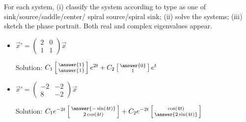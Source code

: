 \documentclass{ximera}
\begin{document}
\begin{exercise}%
    For each system, (i) classify the system according to type as one of sink/source/saddle/center/ spiral source/spiral sink; (ii) solve the systems; (iii) sketch the phase portrait. Both real and complex eigenvalues appear. %
    \begin{itemize}
        \item $\vec{x}'=\begin{pmatrix} 2&0 \\ 1&1 \end{pmatrix}\vec{x}$ %
            \begin{multipleChoice}
            \end{multipleChoice}
            Solution: $C_1\left[\begin{smallmatrix} \answer{1} \\ \answer{1} \end{smallmatrix}\right]e^{2t} + C_2\left[\begin{smallmatrix} \answer{0} \\ 1 \end{smallmatrix}\right]e^t$  \\
            
        \item $\vec{x}'=\begin{pmatrix} -2& -2\\ 8& -2\end{pmatrix}\vec{x}$ %
            \begin{multipleChoice}
            \end{multipleChoice}
            Solution:  $C_1e^{-2t}\left[\begin{smallmatrix} \answer{-\sin(4t)} \\ 2\cos(4t) \end{smallmatrix}\right] + C_2e^{-2t}\left[\begin{smallmatrix} \cos(4t) \\ \answer{2\sin(4t)} \end{smallmatrix}\right]$ \\
            

\end{itemize}
\end{exercise}
\end{document}
